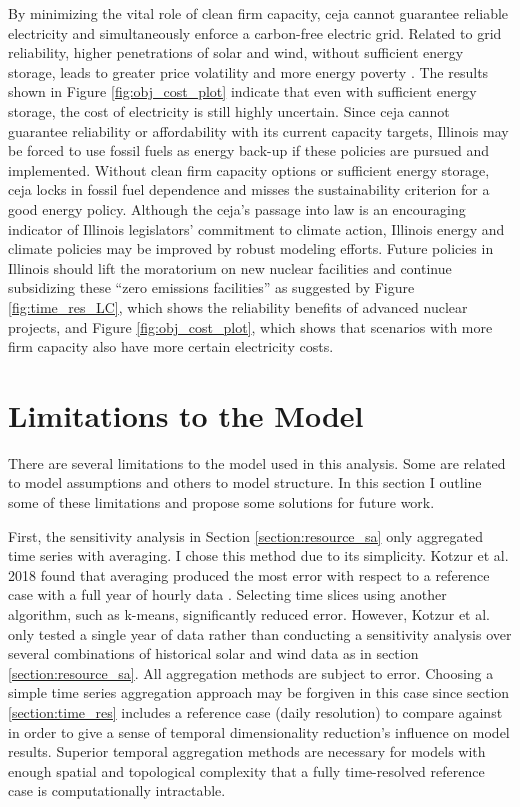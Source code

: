 By minimizing the vital role of clean firm capacity, \gls{ceja} cannot guarantee
reliable electricity and simultaneously enforce a carbon-free electric grid. Related to grid
reliability, higher penetrations of solar and wind, without sufficient energy
storage, leads to greater price volatility \cite{winkler_impact_2016, blazquez_renewable_2018}
and more energy poverty \cite{henry_how_2021}. The results shown in Figure
\ref{fig:obj_cost_plot} indicate that even with sufficient energy storage, the cost
of electricity is still highly uncertain. Since
\gls{ceja} cannot guarantee reliability or affordability with its current capacity
targets, Illinois may be forced to use fossil fuels as energy back-up if these
policies are pursued and implemented. Without
clean firm capacity options or sufficient energy storage, \gls{ceja} locks in
fossil fuel dependence and misses the sustainability criterion for a good energy policy.
Although the \gls{ceja}'s passage into law is an encouraging indicator of Illinois
legislators' commitment to climate action, Illinois energy and climate policies
may be improved by robust modeling efforts. Future
policies in Illinois should lift the moratorium on new nuclear facilities and
continue subsidizing these ``zero emissions facilities'' as suggested by Figure
\ref{fig:time_res_LC}, which shows the reliability benefits of advanced nuclear
projects, and Figure \ref{fig:obj_cost_plot}, which shows that scenarios with
more firm capacity also have more certain electricity costs.

\section{Limitations to the Model}

There are several limitations to the model used in this analysis. Some are related
to model assumptions and others to model structure. In this section I outline some
of these limitations and propose some solutions for future work.

First, the sensitivity analysis in Section \ref{section:resource_sa} only aggregated
time series with averaging. I chose this method due to its simplicity. Kotzur
et al. 2018 found that averaging produced the most error with respect to a
reference case with a full year of
hourly data \cite{kotzur_impact_2018}. Selecting time slices using another algorithm,
such as k-means, significantly reduced error. However, Kotzur et al. only tested a single
year of data rather than conducting a sensitivity analysis over several combinations
of historical solar and wind data as in section
\ref{section:resource_sa}. All aggregation methods are subject to error. Choosing
a simple time series aggregation approach may be forgiven in this case since section
\ref{section:time_res} includes a reference case (daily resolution) to compare against
in order to give a sense of temporal dimensionality reduction's influence on model
results. Superior temporal aggregation methods are necessary for models with enough
spatial and topological complexity that a fully time-resolved reference case is
computationally intractable.

